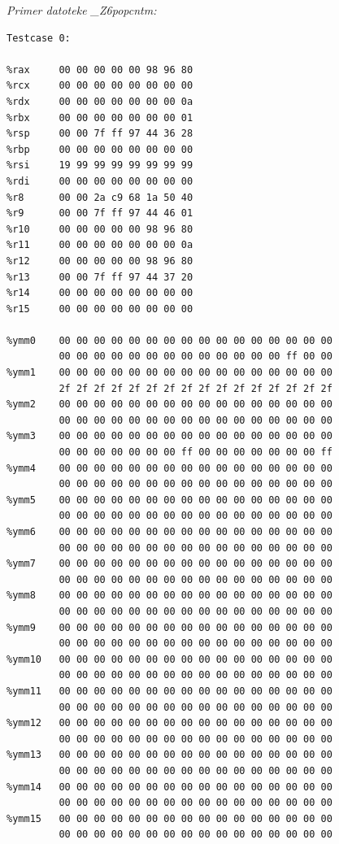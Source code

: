 \documentclass[a4paper, 12pt]{book}
\begin{document}
 \noindent
 {\it Primer datoteke \_Z6popcntm:}
 \begin{Verbatim}[baselinestretch=1]
Testcase 0:
 
%rax     00 00 00 00 00 98 96 80
%rcx     00 00 00 00 00 00 00 00
%rdx     00 00 00 00 00 00 00 0a
%rbx     00 00 00 00 00 00 00 01
%rsp     00 00 7f ff 97 44 36 28
%rbp     00 00 00 00 00 00 00 00
%rsi     19 99 99 99 99 99 99 99
%rdi     00 00 00 00 00 00 00 00
%r8      00 00 2a c9 68 1a 50 40
%r9      00 00 7f ff 97 44 46 01
%r10     00 00 00 00 00 98 96 80
%r11     00 00 00 00 00 00 00 0a
%r12     00 00 00 00 00 98 96 80
%r13     00 00 7f ff 97 44 37 20
%r14     00 00 00 00 00 00 00 00
%r15     00 00 00 00 00 00 00 00

%ymm0    00 00 00 00 00 00 00 00 00 00 00 00 00 00 00 00 
		 00 00 00 00 00 00 00 00 00 00 00 00 00 ff 00 00
%ymm1    00 00 00 00 00 00 00 00 00 00 00 00 00 00 00 00 
         2f 2f 2f 2f 2f 2f 2f 2f 2f 2f 2f 2f 2f 2f 2f 2f
%ymm2    00 00 00 00 00 00 00 00 00 00 00 00 00 00 00 00 
	     00 00 00 00 00 00 00 00 00 00 00 00 00 00 00 00
%ymm3    00 00 00 00 00 00 00 00 00 00 00 00 00 00 00 00 
	   	 00 00 00 00 00 00 00 ff 00 00 00 00 00 00 00 ff
%ymm4    00 00 00 00 00 00 00 00 00 00 00 00 00 00 00 00 
         00 00 00 00 00 00 00 00 00 00 00 00 00 00 00 00
%ymm5    00 00 00 00 00 00 00 00 00 00 00 00 00 00 00 00 
         00 00 00 00 00 00 00 00 00 00 00 00 00 00 00 00
%ymm6    00 00 00 00 00 00 00 00 00 00 00 00 00 00 00 00 
         00 00 00 00 00 00 00 00 00 00 00 00 00 00 00 00
%ymm7    00 00 00 00 00 00 00 00 00 00 00 00 00 00 00 00 
         00 00 00 00 00 00 00 00 00 00 00 00 00 00 00 00
%ymm8    00 00 00 00 00 00 00 00 00 00 00 00 00 00 00 00 
         00 00 00 00 00 00 00 00 00 00 00 00 00 00 00 00
%ymm9    00 00 00 00 00 00 00 00 00 00 00 00 00 00 00 00 
         00 00 00 00 00 00 00 00 00 00 00 00 00 00 00 00
%ymm10   00 00 00 00 00 00 00 00 00 00 00 00 00 00 00 00 
         00 00 00 00 00 00 00 00 00 00 00 00 00 00 00 00
%ymm11   00 00 00 00 00 00 00 00 00 00 00 00 00 00 00 00 
         00 00 00 00 00 00 00 00 00 00 00 00 00 00 00 00
%ymm12   00 00 00 00 00 00 00 00 00 00 00 00 00 00 00 00 
         00 00 00 00 00 00 00 00 00 00 00 00 00 00 00 00
%ymm13   00 00 00 00 00 00 00 00 00 00 00 00 00 00 00 00 
         00 00 00 00 00 00 00 00 00 00 00 00 00 00 00 00
%ymm14   00 00 00 00 00 00 00 00 00 00 00 00 00 00 00 00 
         00 00 00 00 00 00 00 00 00 00 00 00 00 00 00 00
%ymm15   00 00 00 00 00 00 00 00 00 00 00 00 00 00 00 00 
         00 00 00 00 00 00 00 00 00 00 00 00 00 00 00 00
 

\end{Verbatim}
\end{document}
